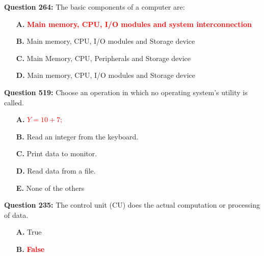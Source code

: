 \documentclass[12pt,a4paper]{article}
\begin{document}
\vspace{0.5cm}

\vspace{0.5cm}

\textbf{Question 264:} The basic components of a computer are:

\begin{itemize}
    \item[\textbf{A.}] \textcolor{red}{\textbf{Main memory, CPU, I/O modules and system interconnection}}
    \item[\textbf{B.}] Main memory, CPU, I/O modules and Storage device
    \item[\textbf{C.}] Main Memory, CPU, Peripherals and Storage device
    \item[\textbf{D.}] Main memory, CPU, I/O modules and Storage device
\end{itemize}

\vspace{0.5cm}

\vspace{0.5cm}

\textbf{Question 519:} Choose an operation in which no operating system's utility is called.

\begin{itemize}
    \item[\textbf{A.}] \textcolor{red}{\textbf{$Y = 10 + 7;$}}
    \item[\textbf{B.}] Read an integer from the keyboard.
    \item[\textbf{C.}] Print data to monitor.
    \item[\textbf{D.}] Read data from a file.
    \item[\textbf{E.}] None of the others
\end{itemize}

\vspace{0.5cm}

\vspace{0.5cm}

\textbf{Question 235:} The control unit (CU) does the actual computation or processing of data.

\begin{itemize}
    \item[\textbf{A.}] True
    \item[\textbf{B.}] \textcolor{red}{\textbf{False}}
\end{itemize}

\vspace{0.5cm}
\end{document}
